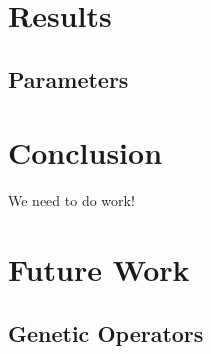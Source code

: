 \documentclass{acm_proc_article-sp}
\begin{document}
\section{Results}
    
    \subsection{Parameters}

\section{Conclusion}

	We need to do work!
    
\section{Future Work}

    \subsection{Genetic Operators}


%


\begin{thebibliography}{1}


\end{thebibliography}


\balancecolumns
\end{document}
